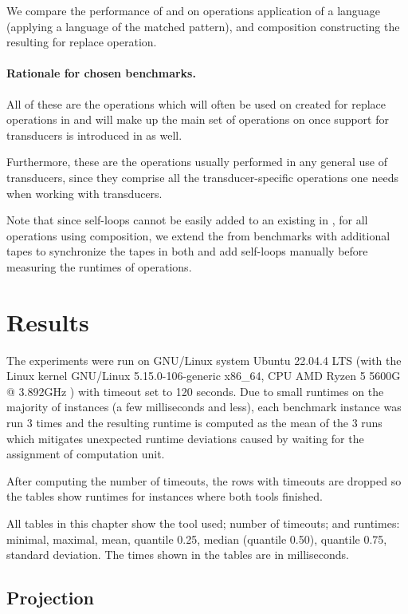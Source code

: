 We compare the performance of \mata and \mona on operations application of a language (applying a language of the matched pattern), and composition constructing the resulting \nft for replace operation.

\paragraph{Rationale for chosen benchmarks.}
All of these are the operations which will often be used on \nfts created for replace operations in \noodler and will make up the main set of operations on \nfts once support for transducers is introduced in \noodler as well.

Furthermore, these are the operations usually performed in any general use of transducers, since they comprise all the transducer-specific operations one needs when working with transducers.

Note that since self-loops cannot be easily added to an existing \nft in \mona, for all operations using composition, we extend the \nfts from benchmarks with additional tapes to synchronize the tapes in both \nfts and add self-loops manually before measuring the runtimes of operations.

\section{Results}

The experiments were run on GNU/Linux system Ubuntu 22.04.4 LTS (with the Linux kernel GNU/Linux 5.15.0-106-generic x86\_64, CPU AMD Ryzen 5 5600G @ 3.892GHz ) with timeout set to 120 seconds. Due to small runtimes on the majority of instances (a few milliseconds and less), each benchmark instance was run $3$ times and the resulting runtime is computed as the mean of the $3$ runs which mitigates unexpected runtime deviations caused by waiting for the assignment of computation unit.

After computing the number of timeouts, the rows with timeouts are dropped so the tables show runtimes for instances where both tools finished.

All tables in this chapter show the tool used; number of timeouts; and runtimes: minimal, maximal, mean, quantile 0.25, median (quantile 0.50), quantile 0.75, standard deviation.
The times shown in the tables are in milliseconds.

\subsection{Projection}

